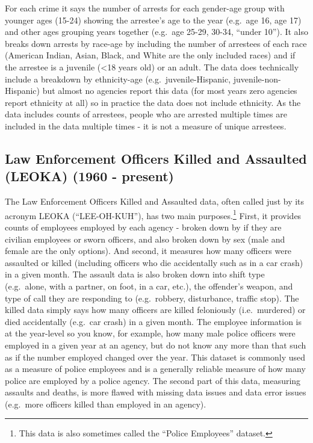 \documentclass[
]{krantz}
\begin{document}
For each crime it says the number of arrests for each
gender-age group with younger ages (15-24) showing the
arrestee's age to the year (e.g.~age 16, age 17) and other
ages grouping years together (e.g.~age 25-29, 30-34, ``under
10''). It also breaks down arrests by race-age by including
the number of arrestees of each race (American Indian,
Asian, Black, and White are the only included races) and if
the arrestee is a juvenile (\textless18 years old) or an
adult. The data does technically include a breakdown by
ethnicity-age (e.g.~juvenile-Hispanic,
juvenile-non-Hispanic) but almost no agencies report this
data (for most years zero agencies report ethnicity at all)
so in practice the data does not include ethnicity. As the
data includes counts of arrestees, people who are arrested
multiple times are included in the data multiple times - it
is not a measure of unique arrestees.

\subsection{Law Enforcement Officers Killed and Assaulted
(LEOKA) (1960 -
present)}\label{law-enforcement-officers-killed-and-assaulted-leoka-1960---present}

The Law Enforcement Officers Killed and Assaulted data,
often called just by its acronym LEOKA (``LEE-OH-KUH''), has
two main purposes.\footnote{This data is also sometimes
  called the ``Police Employees'' dataset.} First, it
provides counts of employees employed by each agency -
broken down by if they are civilian employees or sworn
officers, and also broken down by sex (male and female are
the only options). And second, it measures how many officers
were assaulted or killed (including officers who die
accidentally such as in a car crash) in a given month. The
assault data is also broken down into shift type
(e.g.~alone, with a partner, on foot, in a car, etc.), the
offender's weapon, and type of call they are responding to
(e.g.~robbery, disturbance, traffic stop). The killed data
simply says how many officers are killed feloniously
(i.e.~murdered) or died accidentally (e.g.~car crash) in a
given month. The employee information is at the year-level
so you know, for example, how many male police officers were
employed in a given year at an agency, but do not know any
more than that such as if the number employed changed over
the year. This dataset is commonly used as a measure of
police employees and is a generally reliable measure of how
many police are employed by a police agency. The second part
of this data, measuring assaults and deaths, is more flawed
with missing data issues and data error issues (e.g.~more
officers killed than employed in an agency).
\end{document}
